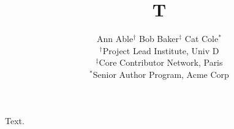 \documentclass{article}
\begin{document}
\title{T}
\author{Ann Able$^{\dagger}$ \quad Bob Baker$^{\ddagger}$ \quad Cat Cole$^{*}$\\
$^{\dagger}$Project Lead Institute, Univ D\\
$^{\ddagger}$Core Contributor Network, Paris\\
$^{*}$Senior Author Program, Acme Corp}
\maketitle
Text.
\end{document}
